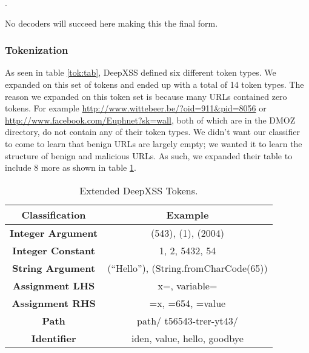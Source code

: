 . 

No decoders will succeed here making this the final form.


\subsubsection{Tokenization}
As seen in table \ref{tok:tab}, DeepXSS defined six different token types. We expanded on this set of tokens and ended up with a total of 14 token types. The reason we expanded on this token set is because many URLs contained zero tokens. For example \url{http://www.wittebeer.be/?oid=911\&pid=8056} or \url{http://www.facebook.com/Euphnet?sk=wall}, both of which are in the DMOZ directory, do not contain any of their token types. We didn't want our classifier to come to learn that benign URLs are largely empty; we wanted it to learn the structure of benign and malicious URLs. As such, we expanded their table to include 8 more as shown in table \ref{exp:tok:tab}.


\begin{table}
\begin{center}
\begingroup
\setlength{\tabcolsep}{5pt} %
\renewcommand{\arraystretch}{1.5} %
\begin{tabular}{||c | c||} 
    \hline
    Classification & Example \\ [0.5ex] 
    \hline\hline
    \textbf{Integer Argument} &  (543), (1), (2004) \\ 
    \hline
    \textbf{Integer Constant} &  1, 2, 5432, 54 \\ 
    \hline
    \textbf{String Argument} & (``Hello''), (String.fromCharCode(65)) \\
    \hline
    \textbf{Assignment LHS} & x=, variable= \\
    \hline
    \textbf{Assignment RHS} & =x, =654, =value \\
    \hline
    \textbf{Path} & path/ t56543-trer-yt43/ \\ 
    \hline
    \textbf{Identifier} & iden, value, hello, goodbye \\ [1ex] 
    \hline
\end{tabular}
\endgroup
\caption{\label{exp:tok:tab}Extended DeepXSS Tokens.}
\end{center}
\end{table}

